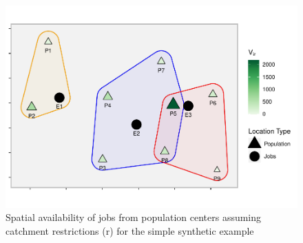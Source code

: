 \documentclass[]{elsarticle} %
\begin{document}
\begin{figure}
\includegraphics[width=1\linewidth]{Spatial-Availability_files/figure-latex/toy-example-availability-with-catchments-1} \caption{\label{fig:toy-example-availability-with-catchments}Spatial availability of jobs from population centers assuming catchment restrictions (r) for the simple synthetic example}\label{fig:toy-example-availability-with-catchments}
\end{figure}
\end{document}
